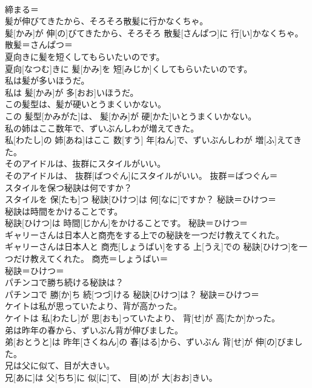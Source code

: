 \documentclass[8pt]{extreport}
\begin{document}
\begin{CJK}{UTF8}{min}
\\	締まる＝ 
\\	髪が伸びてきたから、そろそろ散髪に行かなくちゃ。	
\\	髪[かみ]が 伸[の]びてきたから、そろそろ 散髪[さんぱつ]に 行[い]かなくちゃ。	散髪＝さんぱつ＝ 
\\	夏向きに髪を短くしてもらいたいのです。	
\\	夏向[なつむ]きに 髪[かみ]を 短[みじか]くしてもらいたいのです。	
\\	私は髪が多いほうだ。	
\\	私は 髪[かみ]が 多[おお]いほうだ。	
\\	この髪型は、髪が硬いとうまくいかない。	
\\	この 髪型[かみがた]は、 髪[かみ]が 硬[かた]いとうまくいかない。	
\\	私の姉はここ数年で、ずいぶんしわが増えてきた。	
\\	私[わたし]の 姉[あね]はここ 数[すう] 年[ねん]で、ずいぶんしわが 増[ふ]えてきた。	
\\	そのアイドルは、抜群にスタイルがいい。	
\\	そのアイドルは、 抜群[ばつぐん]にスタイルがいい。	抜群＝ばつぐん＝ 
\\	スタイルを保つ秘訣は何ですか？	
\\	スタイルを 保[たも]つ 秘訣[ひけつ]は 何[なに]ですか？	秘訣＝ひけつ＝ 
\\	秘訣は時間をかけることです。	
\\	秘訣[ひけつ]は 時間[じかん]をかけることです。	秘訣＝ひけつ＝ 
\\	ギャリーさんは日本人と商売をする上での秘訣を一つだけ教えてくれた。	
\\	ギャリーさんは日本人と 商売[しょうばい]をする 上[うえ]での 秘訣[ひけつ]を一つだけ教えてくれた。	商売＝しょうばい＝ 
\\	秘訣＝ひけつ＝ 
\\	パチンコで勝ち続ける秘訣は？	
\\	パチンコで 勝[か]ち 続[つづ]ける 秘訣[ひけつ]は？	秘訣＝ひけつ＝ 
\\	ケイトは私が思っていたより、背が高かった。	
\\	ケイトは 私[わたし]が 思[おも]っていたより、 背[せ]が 高[たか]かった。	
\\	弟は昨年の春から、ずいぶん背が伸びました。	
\\	弟[おとうと]は 昨年[さくねん]の 春[はる]から、ずいぶん 背[せ]が 伸[の]びました。	
\\	兄は父に似て、目が大きい。	
\\	兄[あに]は 父[ちち]に 似[に]て、 目[め]が 大[おお]きい。	

\end{CJK}
\end{document}
